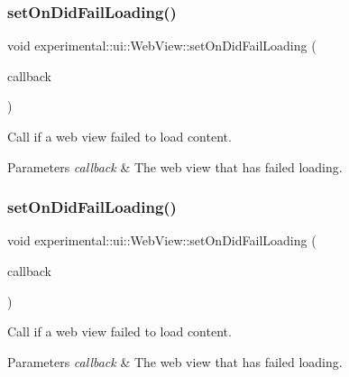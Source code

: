 \subsubsection{\texorpdfstring{set\+On\+Did\+Fail\+Loading()}{setOnDidFailLoading()}\hspace{0.1cm}{\footnotesize\ttfamily [1/2]}}
{\footnotesize\ttfamily void experimental\+::ui\+::\+Web\+View\+::set\+On\+Did\+Fail\+Loading (\begin{DoxyParamCaption}\item[{const \hyperlink{classexperimental_1_1ui_1_1WebView_a11ddd376a5996eff614857f236b2b69d}{cc\+Web\+View\+Callback} \&}]{callback }\end{DoxyParamCaption})}

Call if a web view failed to load content.


\begin{DoxyParams}{Parameters}
{\em callback} & The web view that has failed loading. \\
\hline
\end{DoxyParams}
\mbox{\label{classexperimental_1_1ui_1_1WebView_aae599457e3ff606b3b3751bcebe1df29}} 
\subsubsection{\texorpdfstring{set\+On\+Did\+Fail\+Loading()}{setOnDidFailLoading()}\hspace{0.1cm}{\footnotesize\ttfamily [2/2]}}
{\footnotesize\ttfamily void experimental\+::ui\+::\+Web\+View\+::set\+On\+Did\+Fail\+Loading (\begin{DoxyParamCaption}\item[{const \hyperlink{classexperimental_1_1ui_1_1WebView_a11ddd376a5996eff614857f236b2b69d}{cc\+Web\+View\+Callback} \&}]{callback }\end{DoxyParamCaption})}

Call if a web view failed to load content.


\begin{DoxyParams}{Parameters}
{\em callback} & The web view that has failed loading. \\
\hline
\end{DoxyParams}
\mbox{\label{classexperimental_1_1ui_1_1WebView_a6fb8d736506be3151a8a5e3f08d6b7ea}} 
